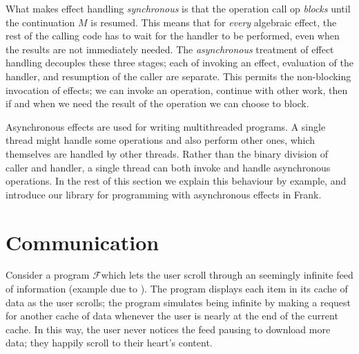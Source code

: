 \documentclass[msc,deptreport,cs]{infthesis} %
\newcommand{\code}[1]{\lstinline{#1}}
\newcommand\feed{$\mathcal{F}$}
\newcommand{\todo}[1]
           {{\par\noindent\small\color{RoyalPurple}
  \framebox{\parbox{\dimexpr\linewidth-2\fboxsep-2\fboxrule}
    {\textbf{TODO:} #1}}}}
\begin{document}
What makes effect handling \emph{synchronous} is that the operation call
\textsf{op} \emph{blocks} until the continuation $M$ is resumed. This means that
for \emph{every} algebraic effect, the rest of the calling code has to wait for
the handler to be performed, even when the results are not immediately needed.
The \emph{asynchronous} treatment of effect handling decouples these three
stages; each of invoking an effect, evaluation of the handler, and resumption of
the caller are separate.
%
This permits the non-blocking invocation of effects; we can invoke an operation,
continue with other work, then if and when we need the result of the operation
we can choose to block.
%


Asynchronous effects are used for writing multithreaded programs. A single
thread might handle some operations and also perform other ones, which
themselves are handled by other threads. Rather than the binary division of
caller and handler, a single thread can both invoke and handle asynchronous
operations. In the rest of this section we explain this behaviour by example,
and introduce our library for programming with asynchronous effects in Frank.

%


\section{Communication}

Consider a program \feed which lets the user scroll through an seemingly
infinite feed of information (example due to \cite{ahman2020asynchronous}). The
program displays each item in its cache of data as the user scrolls; the program
simulates being infinite by making a request for another cache of data whenever
the user is nearly at the end of the current cache. In this way, the user never
notices the feed pausing to download more data; they happily scroll to their
heart's content.
\end{document}
